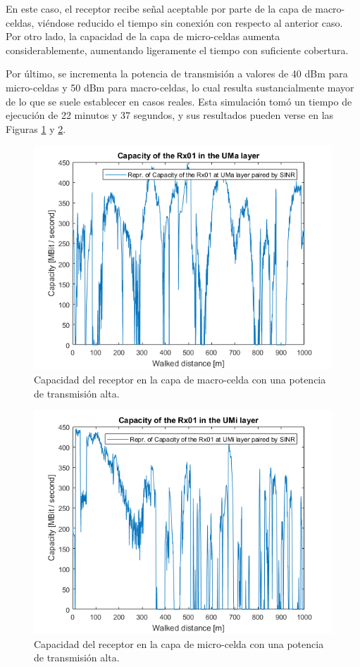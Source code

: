 En este caso, el receptor recibe señal aceptable por parte de la capa de macro-celdas, viéndose reducido el tiempo sin conexión con respecto al anterior caso. Por otro lado, la capacidad de la capa de micro-celdas aumenta considerablemente, aumentando ligeramente el tiempo con suficiente cobertura.

Por último, se incrementa la potencia de transmisión a valores de 40 dBm para micro-celdas y 50 dBm para macro-celdas, lo cual resulta sustancialmente mayor de lo que se suele establecer en casos reales. Esta simulación tomó un tiempo de ejecución de 22 minutos y 37 segundos, y sus resultados pueden verse en las Figuras \ref{fig:simulacion_pot_max_uma} y \ref{fig:simulacion_pot_max_umi}.

\begin{figure}[h!]
	\centering
    \includegraphics[width=0.8\linewidth]{imagenes/6_4_capacidad_uma_max.png}
	\caption{Capacidad del receptor en la capa de macro-celda con una potencia de transmisión alta.}
	\label{fig:simulacion_pot_max_uma}
\end{figure}

\begin{figure}[h!]
	\centering
    \includegraphics[width=0.8\linewidth]{imagenes/6_4_capacidad_umi_max.png}
	\caption{Capacidad del receptor en la capa de micro-celda con una potencia de transmisión alta.}
	\label{fig:simulacion_pot_max_umi}
\end{figure}

